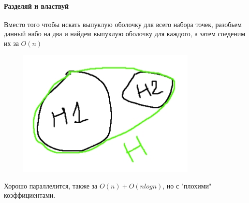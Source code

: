 \paragraph*{Разделяй и властвуй} Вместо того чтобы искать выпуклую оболочку для всего набора точек, разобьем данный набо на два и найдем выпуклую оболочку для каждого, а затем соеденим их за $O(n)$

\begin{figure}[H]
    \centering
    \includegraphics[width = 9cm]{Hull_merging.jpg}
    \caption{}
    \label{fig:float}
\end{figure}

Хорошо параллелится, также за $O(n) + O(nlogn)$, но с "плохими" коэффициентами.
